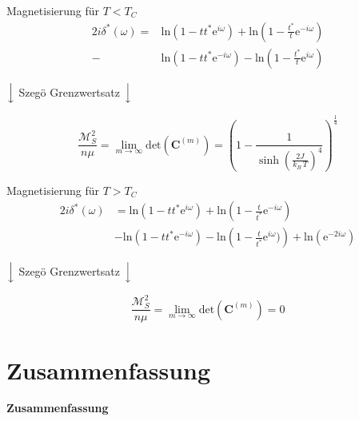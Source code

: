 \documentclass[11pt]{beamer}
\renewcommand{\det}[1]{\mathrm{det}\left( #1 \right)}
\renewcommand{\ln}[1]{\mathrm{ln}\left( #1 \right)}
\begin{document}
    \begin{frame}{Magnetisierung für $T < T_C$}
    \centering
    \begin{align} \nonumber
        2i\delta^*(\omega) =& \ln{1- tt^*\mathrm{e}^{i\omega}} + \ln{1- \frac{t^*}{t}\mathrm{e}^{-i\omega}}\\ - &\ln{1- tt^*\mathrm{e}^{-i\omega}} - \ln{1-\frac{t^*}{t}\mathrm{e}^{i\omega}} \nonumber
    \end{align}
    
    \vspace{0.1cm}
    $\Big \downarrow$ Szegö Grenzwertsatz $\Big \downarrow$
    \vspace{0.1cm}
    
    \begin{equation} \nonumber
    \frac{\mathcal{M}_S^2}{ n \mu} = \lim_{m \rightarrow \infty} \det{\bm{C}^{(m)}} = \left( 1 - \frac{1}{\sinh(\frac{2J}{k_B\,T})^4}\right)^{\frac{1}{4}} 
    \end{equation}
    
    \end{frame}
    
    
    \begin{frame}{Magnetisierung für $T > T_C$}
    \centering
        \begin{align}
            2 i \delta^*(\omega) &= \nonumber \ln{1-tt^*\mathrm{e}^{i\omega}} + \ln{1-\frac{t}{t^*}\mathrm{e}^{-i\omega}} \\ \nonumber &- \ln{1-tt^*\mathrm{e}^{-i\omega}} - \ln{1-\frac{t}{t^*}\mathrm{e}^{i\omega})} +  \ln{\mathrm{e}^{-2i\omega} }  
        \end{align}
    
    \vspace{0.1cm}
    $\Big \downarrow$ Szegö Grenzwertsatz $\Big \downarrow$
    \vspace{0.1cm}
    
        \begin{equation} \nonumber
            \frac{\mathcal{M}_S^2}{ n \mu} = \lim_{m \rightarrow \infty} \det{\bm{C}^{(m)}} = 0
        \end{equation}
    
    \end{frame}
    
        
\section{Zusammenfassung}
    
    \begin{frame}
        \centering
        \LARGE
        \textbf{Zusammenfassung}
    \end{frame}
    
\end{document}
